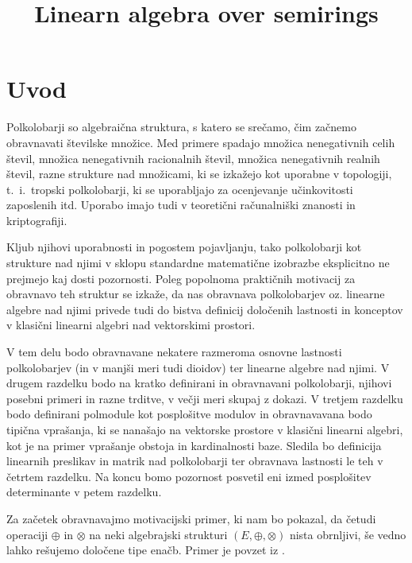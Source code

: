 \documentclass[mat1]{fmfdelo}
\title{Linearn algebra over semirings}
\begin{document}
\newpage
\tableofcontents
\newpage
\section{Uvod}
Polkolobarji so algebraična struktura, s katero se srečamo, čim začnemo obravnavati številske množice. Med primere spadajo množica nenegativnih celih števil, množica nenegativnih racionalnih števil, množica nenegativnih realnih števil, razne strukture nad množicami, ki se izkažejo kot uporabne v topologiji, t.~i.~tropski polkolobarji, ki se uporabljajo za ocenjevanje učinkovitosti zaposlenih itd. Uporabo imajo tudi v teoretični računalniški znanosti in kriptografiji. 

Kljub njihovi uporabnosti in pogostem pojavljanju, tako polkolobarji kot strukture nad njimi v sklopu standardne matematične izobrazbe eksplicitno ne prejmejo kaj dosti pozornosti. Poleg popolnoma praktičnih motivacij za obravnavo teh struktur se izkaže, da nas obravnava polkolobarjev oz. linearne algebre nad njimi privede tudi do bistva definicij določenih lastnosti in konceptov v klasični linearni algebri nad vektorskimi prostori. 

V tem delu bodo obravnavane nekatere razmeroma osnovne lastnosti polkolobarjev (in v manjši meri tudi dioidov) ter linearne algebre nad njimi. V drugem razdelku bodo na kratko definirani in obravnavani polkolobarji, njihovi posebni primeri in razne trditve, v večji meri skupaj z dokazi. V tretjem razdelku bodo definirani polmodule kot posplošitve modulov in obravnavavana bodo tipična vprašanja, ki se nanašajo na vektorske prostore v klasični linearni algebri, kot je na primer vprašanje obstoja in kardinalnosti baze. Sledila bo definicija linearnih preslikav in matrik nad polkolobarji ter obravnava lastnosti le teh v četrtem razdelku. Na koncu bomo pozornost posvetil eni izmed posplošitev determinante v petem razdelku.


Za začetek obravnavajmo motivacijski primer, ki nam bo pokazal, da četudi operaciji $\oplus$ in $\otimes$ na neki algebrajski strukturi $(E, \oplus, \otimes)$ nista obrnljivi, še vedno lahko rešujemo določene tipe enačb. Primer je povzet iz \cite{bib:Gondran}.
\end{document}
